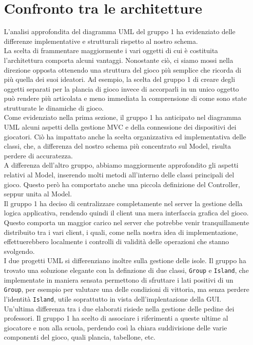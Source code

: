 \documentclass[a4paper]{article}
\begin{document}
	\section{Confronto tra le architetture}
	
	
	L'analisi approfondita del diagramma UML del gruppo 1 ha evidenziato delle differenze implementative e strutturali rispetto al nostro schema. \\
	
	La scelta di frammentare maggiormente i vari oggetti di cui è costituita l'architettura comporta alcuni vantaggi. Nonostante ciò, ci siamo mossi nella direzione opposta ottenendo una struttura del gioco più semplice che ricorda di più quella dei suoi ideatori. Ad esempio, la scelta del gruppo 1 di creare degli oggetti separati per la plancia di gioco invece di accorparli in un unico oggetto può rendere più articolata e meno immediata la comprensione di come sono state strutturate le dinamiche di gioco. \\
	
	Come evidenziato nella prima sezione, il gruppo 1 ha anticipato nel diagramma UML alcuni aspetti della gestione MVC e della connessione dei dispositivi dei giocatori. Ciò ha impattato anche la scelta organizzativa ed implementativa delle classi, che, a differenza del nostro schema più concentrato sul Model, risulta perdere di accuratezza. \\
	
	A differenza dell'altro gruppo, abbiamo maggiormente approfondito gli aspetti relativi al Model, inserendo molti metodi all'interno delle classi principali del gioco. Questo però ha comportato anche una piccola definizione del Controller, seppur unita al Model. \\
	
	Il gruppo 1 ha deciso di centralizzare completamente nel server la gestione della logica applicativa, rendendo quindi il client una mera interfaccia grafica del gioco. Questo comporta un maggior carico nel server che potrebbe venir tranquillamente distribuito tra i vari client, i quali, come nella nostra idea di implementazione, effettuerebbero localmente i controlli di validità delle operazioni che stanno svolgendo. \\
	
	I due progetti UML si differenziano inoltre sulla gestione delle isole. Il gruppo ha trovato una soluzione elegante con la definzione di due classi, \verb|Group| e \verb|Island|, che implementate in maniera sensata permettono di sfruttare i lati positivi di un \verb|Group|, per esempio per valutare una delle condizioni di vittoria,
	ma senza perdere l'identità \verb|Island|, utile soprattutto in vista dell'implentazione della GUI. \\
	
	Un'ultima differenza tra i due elaborati risiede nella gestione delle pedine dei professori. Il gruppo 1 ha scelto di associare i riferimenti a queste ultime al giocatore e non alla scuola, perdendo così la chiara suddivisione delle varie componenti del gioco, quali plancia, tabellone, etc.  
\end{document}
